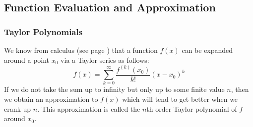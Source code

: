 

\subsection{Function Evaluation and Approximation}

\subsubsection{Taylor Polynomials}
We know from calculus (see page \pageref{Eq:TaylorSeries}) that a function $f(x)$ can be expanded around a point $x_0$ via a Taylor series as follows:
\begin{equation}
f(x) = \sum_{k=0}^\infty \frac{f^{(k)}(x_0)}{k!} (x-x_0)^k
\end{equation}
If we do not take the sum up to infinity but only up to some finite value $n$, then we obtain an approximation to $f(x)$ which will tend to get better when we crank up $n$. This approximation is called the $n$th order Taylor polynomial of $f$ around $x_0$. 









